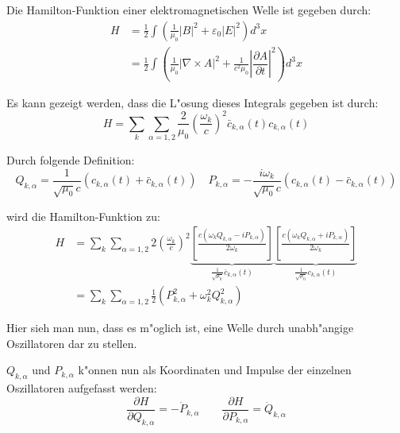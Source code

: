 Die Hamilton-Funktion einer elektromagnetischen Welle ist gegeben durch:
\begin{equation*}
\begin{split}
H &= \frac{1}{2} \int \left(\frac{1}{\mu_0}|B|^2 + \varepsilon_0|E|^2\right) d^3 x \\
	&= \frac{1}{2} \int \left(\frac{1}{\mu_0} | \nabla\times A |^2 + \frac{1}{c^2 \mu_0} \left| \dfrac{\partial A}{\partial t} \right|^2 \right) d^3 x 
\end{split}
\end{equation*}

Es kann gezeigt werden, dass die L"osung dieses Integrals gegeben ist durch:
\begin{equation*}
H = \sum_k \sum_{\alpha=1,2} \frac{2}{\mu_0} \left(\frac{\omega_k}{c}\right)^2 \bar{c}_{k,\alpha}(t) c_{k,\alpha}(t)
\end{equation*}

Durch folgende Definition:
\begin{equation*}
Q_{k,\alpha} = \frac{1}{\sqrt{\mu_0} c}\left(c_{k,\alpha}(t) + \bar{c}_{k,\alpha}(t)\right) \quad P_{k,\alpha} = -\frac{i\omega_k}{\sqrt{\mu_0} c}\left(c_{k,\alpha}(t) - \bar{c}_{k,\alpha}(t)\right) 
\end{equation*}

wird die Hamilton-Funktion zu:
\begin{equation} \label{fq:hamilton}
\begin{split}
H &= \sum_k \sum_{\alpha=1,2} 2 \left(\frac{\omega_k}{c}\right)^2 
	\underbrace{\left[ \frac{c(\omega_k Q_{k,\alpha} - i P_{k,\alpha})}{2 \omega_k} \right]}_{\frac{1}{\sqrt{\mu_0}} \bar{c}_{k,\alpha}(t)}
	\underbrace{\left[ \frac{c(\omega_k Q_{k,\alpha} + i P_{k,\alpha})}{2 \omega_k} \right]}_{\frac{1}{\sqrt{\mu_0}} c_{k,\alpha}(t)} \\
&= \sum_k \sum_{\alpha=1,2} \frac{1}{2} \left(P_{k,\alpha}^2 + \omega_k^2 Q_{k,\alpha}^2\right)
\end{split}
\end{equation}

Hier sieh man nun, dass es m"oglich ist, eine Welle durch unabh"angige Oszillatoren dar zu stellen.

$Q_{k,\alpha}$ und $P_{k,\alpha}$ k"onnen nun als Koordinaten und Impulse der einzelnen Oszillatoren aufgefasst werden:
\begin{equation*}
\dfrac{\partial H}{\partial Q_{k,\alpha}} = -\dot{P}_{k,\alpha} \qquad \dfrac{\partial H}{\partial P_{k,\alpha}} = \dot{Q}_{k,\alpha}
\end{equation*}

